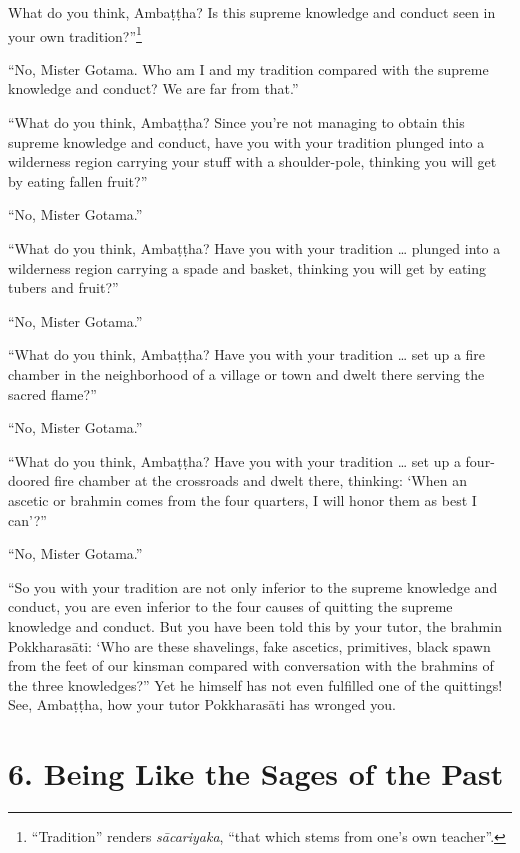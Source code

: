 \documentclass[12pt,openany]{book}%
\begin{document}
What do you think, \textsanskrit{Ambaṭṭha}? Is this supreme knowledge and conduct seen in your own tradition?”\footnote{“Tradition” renders \textit{\textsanskrit{sācariyaka}}, “that which stems from one’s own teacher”. } 

“No, Mister Gotama. Who am I and my tradition compared with the supreme knowledge and conduct? We are far from that.” 

“What do you think, \textsanskrit{Ambaṭṭha}? Since you’re not managing to obtain this supreme knowledge and conduct, have you with your tradition plunged into a wilderness region carrying your stuff with a shoulder-pole, thinking you will get by eating fallen fruit?” 

“No, Mister Gotama.” 

“What do you think, \textsanskrit{Ambaṭṭha}? Have you with your tradition … plunged into a wilderness region carrying a spade and basket, thinking you will get by eating tubers and fruit?” 

“No, Mister Gotama.” 

“What do you think, \textsanskrit{Ambaṭṭha}? Have you with your tradition … set up a fire chamber in the neighborhood of a village or town and dwelt there serving the sacred flame?” 

“No, Mister Gotama.” 

“What do you think, \textsanskrit{Ambaṭṭha}? Have you with your tradition … set up a four-doored fire chamber at the crossroads and dwelt there, thinking: ‘When an ascetic or brahmin comes from the four quarters, I will honor them as best I can’?” 

“No, Mister Gotama.” 

“So you with your tradition are not only inferior to the supreme knowledge and conduct, you are even inferior to the four causes of quitting the supreme knowledge and conduct. But you have been told this by your tutor, the brahmin \textsanskrit{Pokkharasāti}: ‘Who are these shavelings, fake ascetics, primitives, black spawn from the feet of our kinsman compared with conversation with the brahmins of the three knowledges?” Yet he himself has not even fulfilled one of the quittings! See, \textsanskrit{Ambaṭṭha}, how your tutor \textsanskrit{Pokkharasāti} has wronged you. 

\section*{6. Being Like the Sages of the Past }
\end{document}
